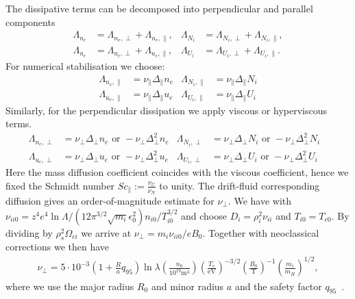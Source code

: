 The dissipative terms can be decomposed into perpendicular and parallel components
\begin{align}
 \Lambda_{n_e} &= \Lambda_{n_e,\perp}+\Lambda_{n_e,\parallel}, &
 \Lambda_{N_i} &= \Lambda_{N_i,\perp}+\Lambda_{N_i,\parallel},\\
 \Lambda_{u_e} &= \Lambda_{u_e,\perp}+\Lambda_{u_e,\parallel},&
 \Lambda_{U_i} &= \Lambda_{U_i,\perp}+\Lambda_{U_i,\parallel}.
\end{align}
For numerical stabilisation we choose:
\begin{align}
\Lambda_{n_e,\parallel} &= \nu_\parallel \Delta_\parallel n_e &
\Lambda_{N_i,\parallel} &= \nu_\parallel \Delta_\parallel N_i \\
\Lambda_{u_e,\parallel} &= \nu_\parallel \Delta_\parallel u_e &
\Lambda_{U_i,\parallel} &= \nu_\parallel \Delta_\parallel U_i
\end{align}
Similarly, for the perpendicular dissipation we apply viscous or hyperviscous terms.
\begin{align}\label{eq:perpdiffNT}
 \Lambda_{n_e,\perp} &=  \nu_\perp \Delta_\perp n_e \text{ or } -\nu_\perp \Delta_\perp^2 n_e&
 \Lambda_{N_i,\perp} &=  \nu_\perp \Delta_\perp N_i \text{ or } -\nu_\perp \Delta_\perp^2 N_i & \\
 \Lambda_{u_e,\perp} &=  \nu_\perp \Delta_\perp u_e \text{ or } -\nu_\perp \Delta_\perp^2 u_e &
 \Lambda_{U_i,\perp} &=  \nu_\perp \Delta_\perp U_i \text{ or } -\nu_\perp \Delta_\perp^2 U_i
\end{align}
Here the mass diffusion coefficient coincides with the viscous coefficient, hence we fixed the Schmidt number \(\mathit{Sc}_\parallel:= \frac{\nu_U}{\nu_N}\) to unity.
The drift-fluid corresponding diffusion gives an order-of-magnitude estimate for $\nu_\perp$.
We have with $\nu_{ii0} = z^4e^4\ln \Lambda/ (12\pi^{3/2} \sqrt{m_i} \epsilon_0^2) n_{i0} /T_{i0}^{3/2}$ and choose $D_i = \rho_i^2 \nu_{ii}$ and $T_{i0} = T_{e0}$.
By dividing by $\rho_s^2 \Omega_{ci}$ we arrive at $\nu_\perp = m_i \nu_{ii0}/eB_0$.
Together with neoclassical corrections we then have
\begin{align}
\nu_\perp =
5\cdot 10^{-3} \left(1+\frac{R}{a}q_{95}\right) \ln \lambda
\left(\frac{n_0}{10^{19}\text{m}^3}\right)
\left(\frac{T_e}{\text{eV}}\right)^{-3/2}
\left(\frac{B_0}{\text{T}}\right)^{-1}
\left(\frac{m_i}{m_H}\right)^{1/2},
\end{align}
where we use the major radius $R_0$ and minor radius $a$ and the safety factor $q_{95}$~\cite{Madsen2016}.

